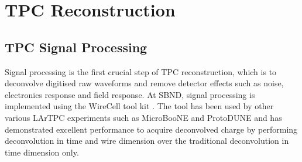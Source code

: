 \newpage
\section{TPC Reconstruction}
\label{sec:reco_tpc}

\subsection{TPC Signal Processing}
Signal processing is the first crucial step of TPC reconstruction, which is to deconvolve digitised raw waveforms and remove detector effects such as noise, electronics response and field response. 
At SBND, signal processing is implemented using the WireCell tool kit \cite{wirecell}.
The tool has been used by other various LArTPC experiments such as MicroBooNE and ProtoDUNE and has demonstrated excellent performance to acquire deconvolved charge by performing deconvolution in time and wire dimension over the traditional deconvolution in time dimension only. 

